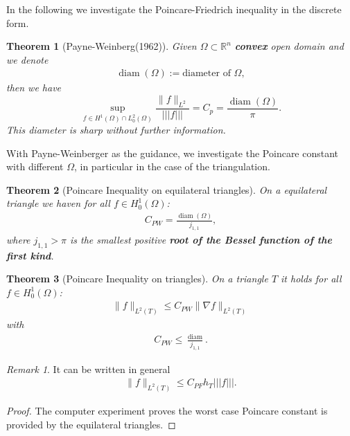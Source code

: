 \documentclass[a4paper,12pt,oneside,fleqn]{book}
\newtheorem{theorem}{Theorem}[section]
\theoremstyle{definition}
\theoremstyle{remark}
\newtheorem*{remark}{Remark}
\DeclareMathOperator*{\diam}{diam}
\begin{document}
In the following we investigate the Poincare-Friedrich inequality in the discrete form. 
\begin{theorem}[Payne-Weinberg(1962)]
	Given $\Omega \subset \mathbb{R}^n$ \textbf{convex} open domain and we denote
	\begin{align*}
		\diam(\Omega):= \text{diameter of }\Omega,
	\end{align*}
	then we have
	\begin{equation}
		\sup_{f \in H^1(\Omega) \cap L_0^2(\Omega)} \frac{\|f\|_{L^2}}{||| f|||} = C_p = \frac{\diam(\Omega)}{\pi}.
	\end{equation}
	This diameter is sharp without further information. 
\end{theorem}


With Payne-Weinberger as the guidance, we investigate the Poincare constant with different $\Omega$, in particular in the case of the triangulation. 


\begin{theorem}[Poincare Inequality on equilateral triangles]
	On a equilateral triangle we haven for all $f \in H^1_0(\Omega)$:
	\begin{align*}
		C_{PW} = \frac{\diam(\Omega)}{j_{1, 1}},
	\end{align*}
	where $j_{1, 1} > \pi $ is the smallest positive \textbf{root of the Bessel function of the first kind}.
\end{theorem}

\begin{theorem}[Poincare Inequality on triangles]
	On a triangle $T$ it holds for all $f \in H^1_0(\Omega)$:
	\begin{align*}
		\|f\|_{L^2(T)} \le C_{PW} \|\nabla f\|_{L^2(T)}
	\end{align*}
	with 
	\begin{align*}
		C_{PW} \le \frac{\diam}{j_{1,1}}.
	\end{align*} 
\end{theorem}
\begin{remark}
It can be written in general
\begin{align*}
	\|f\|_{L^2(T)} \le C_{PF} h_T |||f|||.
\end{align*}	
\end{remark}

\begin{proof}
	The computer experiment proves the worst case Poincare constant is provided by the equilateral triangles. 
\end{proof}
\end{document}
